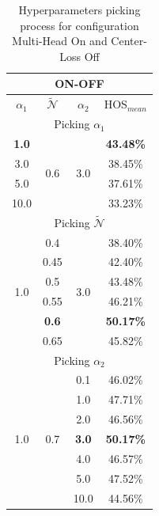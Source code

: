\documentclass[10pt,twocolumn,letterpaper]{article}
\begin{document}
\begin{table}
  \centering
  \begin{tabular}[h]{||c|c|c||c||}
    \hline
    \multicolumn{4}{||c||}{ON-OFF} \\
    \hline
    $\alpha_1$ & $\mathcal{\tilde N}$ & $\alpha_2$ & HOS$_{mean}$\\    
    \hline
    \hline
    \multicolumn{4}{||c||}{Picking $\alpha_1$} \\
    \hline
    {\bf 1.0}  & \multirow{4}{*}{0.6} & \multirow{4}{*}{3.0} & {\bf 43.48\%} \\
    3.0  & & & 38.45\% \\
    5.0  & & & 37.61\% \\
    10.0 & & & 33.23\% \\
    \hline
    \hline
    \multicolumn{4}{||c||}{Picking $\mathcal{\tilde N}$} \\
    \hline
    \multirow{6}{*}{1.0} & 0.4 & \multirow{6}{*}{3.0}  & 38.40\%\\
    & 0.45 & & 42.40\% \\
    & 0.5 & & 43.48\% \\
    & 0.55 & & 46.21\% \\
    & {\bf0.6} & & {\bf 50.17\%} \\
    & 0.65 & & 45.82\% \\
    \hline
    \hline
    \multicolumn{4}{||c||}{Picking $\alpha_2$} \\
    \hline
    \multirow{7}{*}{1.0} & \multirow{7}{*}{0.7} & 0.1 & 46.02\%\\
    && 1.0 & 47.71\% \\
    && 2.0 & 46.56\% \\
    && {\bf 3.0} & {\bf 50.17\%} \\
    && 4.0 & 46.57\% \\
    && 5.0 & 47.52\% \\
    && 10.0 & 44.56\% \\
    \hline
  \end{tabular}
  \caption{\centering\label{tab:ablationonoff} Hyperparameters picking process for configuration Multi-Head On and Center-Loss Off}
\end{table}
\end{document}
